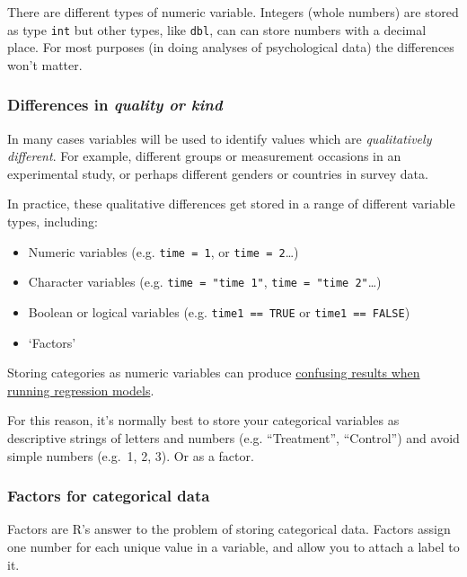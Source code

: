 \documentclass[]{article}
\providecommand{\tightlist}{%
  \setlength{\itemsep}{0pt}\setlength{\parskip}{0pt}}
\theoremstyle{definition}
\theoremstyle{definition}
\theoremstyle{definition}
\theoremstyle{remark}
\begin{document}
There are different types of numeric variable. Integers (whole numbers)
are stored as type \texttt{int} but other types, like \texttt{dbl}, can
can store numbers with a decimal place. For most purposes (in doing
analyses of psychological data) the differences won't matter.

\hypertarget{character-and-factor}{\subsubsection*{\texorpdfstring{Differences
in \emph{quality or
kind}}{Differences in quality or kind}}\label{character-and-factor}}

In many cases variables will be used to identify values which are
\emph{qualitatively different}. For example, different groups or
measurement occasions in an experimental study, or perhaps different
genders or countries in survey data.

In practice, these qualitative differences get stored in a range of
different variable types, including:

\begin{itemize}
\tightlist
\item
  Numeric variables (e.g. \texttt{time\ =\ 1}, or
  \texttt{time\ =\ 2}\ldots{})
\item
  Character variables (e.g. \texttt{time\ =\ "time\ 1"},
  \texttt{time\ =\ "time\ 2"}\ldots{})
\item
  Boolean or logical variables (e.g. \texttt{time1\ ==\ TRUE} or
  \texttt{time1\ ==\ FALSE})
\item
  `Factors'
\end{itemize}

Storing categories as numeric variables can produce
\protect\hyperlink{factors-vs-linear-inputs}{confusing results when
running regression models}.

For this reason, it's normally best to store your categorical variables
as descriptive strings of letters and numbers (e.g. ``Treatment'',
``Control'') and avoid simple numbers (e.g.~1, 2, 3). Or as a factor.

\subsubsection{Factors for categorical
data}\label{factors-for-categorical-data}

Factors are R's answer to the problem of storing categorical data.
Factors assign one number for each unique value in a variable, and allow
you to attach a label to it.
\end{document}

